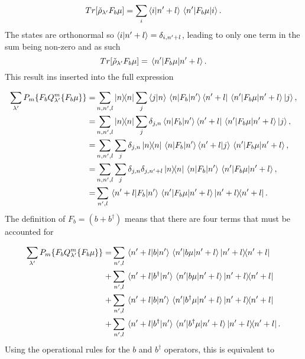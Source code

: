 \documentclass[12pt]{article}
\begin{document}
\begin{equation}
    Tr[\check{\rho}_{\lambda'}F_b \mu] = \sum_{i} \braket{i}{n'+l}\mel{n'}{F_b \mu}{i}.
\end{equation} The states are orthonormal so $\braket{i}{n'+l} = \delta_{i,n'+l}$, leading to only one term in the sum being non-zero and as such
\begin{equation}
    Tr[\check{\rho}_{\lambda'}F_b \mu] = \mel{n'}{F_b \mu}{n'+l}.
\end{equation} This result ins inserted into the full expression

\begin{align*}
    \sum_{\lambda'}  P_m\{F_b Q^m_{\lambda'}\{F_b\mu\}\} =& \sum_{n,n',l} \ketbra{n}{n} \sum_{j}\braket{j}{n}\mel{n}{F_b}{n'}\bra{n'+l}\mel{n'}{F_b\mu}{n'+l}\ket{j},\\
    =& \sum_{n,n',l} \ketbra{n}{n} \sum_{j}\delta_{j,n}\mel{n}{F_b}{n'}\bra{n'+l}\mel{n'}{F_b\mu}{n'+l}\ket{j},\\
    =&\sum_{n,n',l}\sum_{j}\delta_{j,n} \ketbra{n}{n} \mel{n}{F_b}{n'}\braket{n'+l}{j}\mel{n'}{F_b\mu}{n'+l},\\
    =&\sum_{n,n',l}\sum_{j}\delta_{j,n}\delta_{j,n'+l} \ketbra{n}{n} \mel{n}{F_b}{n'}\mel{n'}{F_b\mu}{n'+l},\\
    =&\sum_{n',l} \mel{n'+l}{F_b}{n'}\mel{n'}{F_b\mu}{n'+l}\ketbra{n'+l}{n'+l}.\\
\end{align*} The definition of $F_b=(b+b^\dagger)$ means that there are four terms that must be accounted for

\begin{align*}
    \sum_{\lambda'}  P_m\{F_b Q^m_{\lambda'}\{F_b\mu\}\}=&\sum_{n',l} \mel{n'+l}{b}{n'}\mel{n'}{b\mu}{n'+l}\ketbra{n'+l}{n'+l}\\
    +&\sum_{n',l} \mel{n'+l}{b^\dagger}{n'}\mel{n'}{b\mu}{n'+l}\ketbra{n'+l}{n'+l}\\
    +&\sum_{n',l} \mel{n'+l}{b}{n'}\mel{n'}{b^\dagger\mu}{n'+l}\ketbra{n'+l}{n'+l}\\
    +&\sum_{n',l} \mel{n'+l}{b^\dagger}{n'}\mel{n'}{b^\dagger\mu}{n'+l}\ketbra{n'+l}{n'+l}.
\end{align*} Using the operational rules for the $b$ and $b^\dagger$ operators, this is equivalent to
\end{document}

